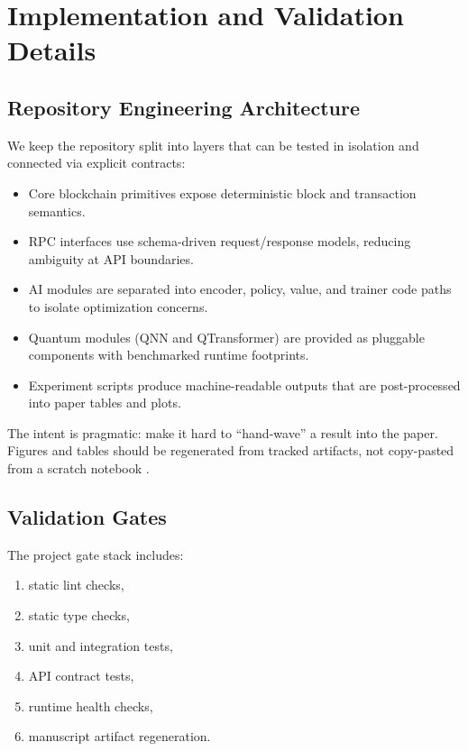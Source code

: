\section{Implementation and Validation Details}

\subsection{Repository Engineering Architecture}

We keep the repository split into layers that can be tested in isolation and connected via explicit contracts:
\begin{itemize}
  \item Core blockchain primitives expose deterministic block and transaction semantics.
  \item RPC interfaces use schema-driven request/response models, reducing ambiguity at API boundaries.
  \item AI modules are separated into encoder, policy, value, and trainer code paths to isolate optimization concerns.
  \item Quantum modules (QNN and QTransformer) are provided as pluggable components with benchmarked runtime footprints.
  \item Experiment scripts produce machine-readable outputs that are post-processed into paper tables and plots.
\end{itemize}

The intent is pragmatic: make it hard to ``hand-wave'' a result into the paper. Figures and tables should be regenerated from tracked artifacts, not copy-pasted from a scratch notebook \citep{wilson2017good,stodden2016enhancing}.

\subsection{Validation Gates}

The project gate stack includes:
\begin{enumerate}
  \item static lint checks,
  \item static type checks,
  \item unit and integration tests,
  \item API contract tests,
  \item runtime health checks,
  \item manuscript artifact regeneration.
\end{enumerate}

